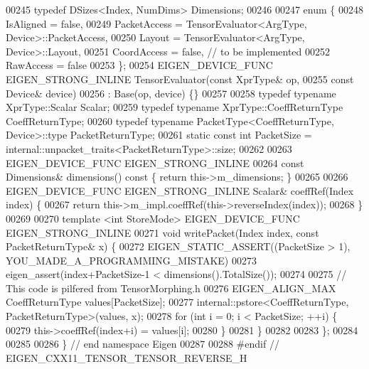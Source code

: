\begin{DoxyCode}
00245   \textcolor{keyword}{typedef} DSizes<Index, NumDims> Dimensions;
00246 
00247   \textcolor{keyword}{enum} \{
00248     IsAligned = \textcolor{keyword}{false},
00249     PacketAccess = TensorEvaluator<ArgType, Device>::PacketAccess,
00250     Layout = TensorEvaluator<ArgType, Device>::Layout,
00251     CoordAccess = \textcolor{keyword}{false},  \textcolor{comment}{// to be implemented}
00252     RawAccess = \textcolor{keyword}{false}
00253   \};
00254   EIGEN\_DEVICE\_FUNC EIGEN\_STRONG\_INLINE TensorEvaluator(\textcolor{keyword}{const} XprType& op,
00255                                                         \textcolor{keyword}{const} Device& device)
00256       : Base(op, device) \{\}
00257 
00258   \textcolor{keyword}{typedef} \textcolor{keyword}{typename} XprType::Scalar Scalar;
00259   \textcolor{keyword}{typedef} \textcolor{keyword}{typename} XprType::CoeffReturnType CoeffReturnType;
00260   \textcolor{keyword}{typedef} \textcolor{keyword}{typename} PacketType<CoeffReturnType, Device>::type PacketReturnType;
00261   \textcolor{keyword}{static} \textcolor{keyword}{const} \textcolor{keywordtype}{int} PacketSize = internal::unpacket\_traits<PacketReturnType>::size;
00262 
00263   EIGEN\_DEVICE\_FUNC EIGEN\_STRONG\_INLINE
00264   \textcolor{keyword}{const} Dimensions& dimensions()\textcolor{keyword}{ const }\{ \textcolor{keywordflow}{return} this->m\_dimensions; \}
00265 
00266   EIGEN\_DEVICE\_FUNC EIGEN\_STRONG\_INLINE Scalar& coeffRef(Index index) \{
00267     \textcolor{keywordflow}{return} this->m\_impl.coeffRef(this->reverseIndex(index));
00268   \}
00269 
00270   \textcolor{keyword}{template} <\textcolor{keywordtype}{int} StoreMode> EIGEN\_DEVICE\_FUNC EIGEN\_STRONG\_INLINE
00271   \textcolor{keywordtype}{void} writePacket(Index index, \textcolor{keyword}{const} PacketReturnType& x) \{
00272     EIGEN\_STATIC\_ASSERT((PacketSize > 1), YOU\_MADE\_A\_PROGRAMMING\_MISTAKE)
00273     eigen\_assert(index+PacketSize-1 < dimensions().TotalSize());
00274 
00275     \textcolor{comment}{// This code is pilfered from TensorMorphing.h}
00276     EIGEN\_ALIGN\_MAX CoeffReturnType values[PacketSize];
00277     internal::pstore<CoeffReturnType, PacketReturnType>(values, x);
00278     \textcolor{keywordflow}{for} (\textcolor{keywordtype}{int} i = 0; i < PacketSize; ++i) \{
00279       this->coeffRef(index+i) = values[i];
00280     \}
00281   \}
00282 
00283 \};
00284 
00285 
00286 \}  \textcolor{comment}{// end namespace Eigen}
00287 
00288 \textcolor{preprocessor}{#endif // EIGEN\_CXX11\_TENSOR\_TENSOR\_REVERSE\_H}
\end{DoxyCode}
